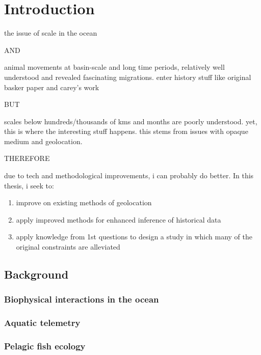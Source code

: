 
\chapter{Introduction}
\raggedbottom
\clearpage

the issue of scale in the ocean

AND

animal movements at basin-scale and long time periods, relatively well understood and revealed fascinating migrations. enter history stuff like original basker paper and carey's work

BUT

scales below hundreds/thousands of kms and months are poorly understood. yet, this is where the interesting stuff happens. this stems from issues with opaque medium and geolocation.

THEREFORE

due to tech and methodological improvements, i can probably do better. In this thesis, i seek to:

\begin{enumerate}
    \item improve on existing methods of geolocation
    \item apply improved methods for enhanced inference of historical data
    \item apply knowledge from 1st questions to design a study in which many of the original constraints are alleviated
\end{enumerate}

\section{Background}

\subsection{Biophysical interactions in the ocean}


\subsection{Aquatic telemetry}


\subsection{Pelagic fish ecology}


